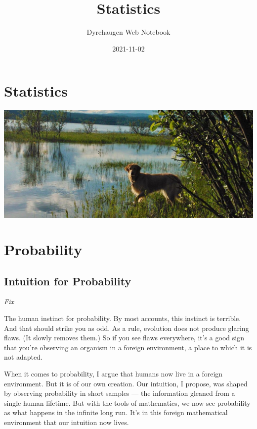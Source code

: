 \documentclass[
]{book}
\title{Statistics}
\author{Dyrehaugen Web Notebook}
\date{2021-11-02}
\begin{document}
\maketitle

{
\setcounter{tocdepth}{1}
\tableofcontents
}
\hypertarget{statistics}{%
\chapter{Statistics}\label{statistics}}

\includegraphics{fig/zelda.jpg}

\hypertarget{probability}{%
\chapter{Probability}\label{probability}}

\hypertarget{intuition-for-probability}{%
\section{Intuition for Probability}\label{intuition-for-probability}}

\emph{Fix}

The human instinct for probability. By most accounts, this instinct is terrible. And that should strike you as odd. As a rule, evolution does not produce glaring flaws. (It slowly removes them.) So if you see flaws everywhere, it's a good sign that you're observing an organism in a foreign environment, a place to which it is not adapted.

When it comes to probability, I argue that humans now live in a foreign environment. But it is of our own creation. Our intuition, I propose, was shaped by observing probability in short samples --- the information gleaned from a single human lifetime. But with the tools of mathematics, we now see probability as what happens in the infinite long run. It's in this foreign mathematical environment that our intuition now lives.
\end{document}
